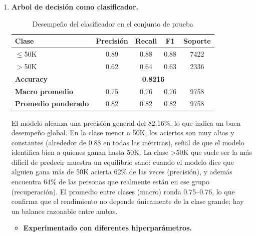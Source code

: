 \documentclass[12pt,a4paper]{article}
\begin{document}
\begin{enumerate}
    \item \textbf{Arbol de decisión como clasificador.}
    
    \begin{table}[H]
      \centering
      \small
        \begin{tabular}{lcccc}
        \toprule
        \textbf{Clase} & \textbf{Precisión} & \textbf{Recall} & \textbf{F1} & \textbf{Soporte} \\
        \midrule
        $\leq$50K & 0.89 & 0.88 & 0.88 & 7422 \\
        $>$50K    & 0.62 & 0.64 & 0.63 & 2336 \\
        \midrule
        \textbf{Accuracy} & \multicolumn{4}{c}{\textbf{0.8216}} \\
        \midrule
        \textbf{Macro promedio}    & 0.75 & 0.76 & 0.76 & 9758 \\
        \textbf{Promedio ponderado} & 0.82 & 0.82 & 0.82 & 9758 \\
        \bottomrule
        \end{tabular}
        \caption{Desempeño del clasificador en el conjunto de prueba}
        \label{tab:clasificador_global}
    \end{table}
    
    El modelo alcanza una precisión general del 82.16\%, lo que indica un buen desempeño global. En la clase menor a 50K, los aciertos 
    son muy altos y constantes (alrededor de 0.88 en todas las métricas), señal de que el modelo identifica bien a quienes ganan hasta 50K. 
    La clase >50K que suele ser la más difícil de predecir muestra un equilibrio sano: cuando el modelo dice que alguien gana más de 50K acierta 62\% 
    de las veces (precisión), y además encuentra 64\% de las personas que realmente están en ese grupo (recuperación). El promedio entre 
    clases (macro) ronda 0.75–0.76, lo que confirma que el rendimiento no depende únicamente de la clase grande; hay un balance razonable 
    entre ambas.

    \begin{itemize}
      \item \textbf{Experimentado con diferentes hiperparámetros.}
      

\end{itemize}
\end{enumerate}
\end{document}
